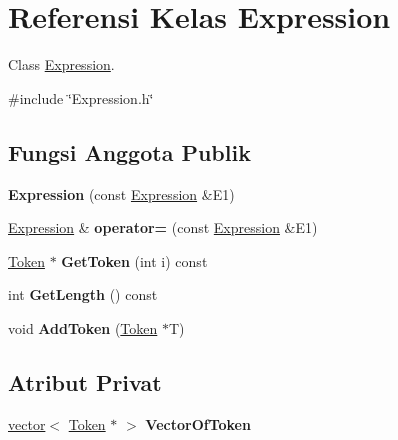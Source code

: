 \hypertarget{classExpression}{}\section{Referensi Kelas Expression}
\label{classExpression}


Class \hyperlink{classExpression}{Expression}.  




{\ttfamily \#include \char`\"{}Expression.\+h\char`\"{}}

\subsection*{Fungsi Anggota Publik}
\begin{DoxyCompactItemize}
\item 
\hypertarget{classExpression_adc6727acfb0cd72c184b6471be928e4a}{}{\bfseries Expression} (const \hyperlink{classExpression}{Expression} \&E1)\label{classExpression_adc6727acfb0cd72c184b6471be928e4a}

\item 
\hypertarget{classExpression_a50017a043b96ee516ed2cafad28bb509}{}\hyperlink{classExpression}{Expression} \& {\bfseries operator=} (const \hyperlink{classExpression}{Expression} \&E1)\label{classExpression_a50017a043b96ee516ed2cafad28bb509}

\item 
\hypertarget{classExpression_a8aff19bc0d16007c40ade71664771e4d}{}\hyperlink{classToken}{Token} $\ast$ {\bfseries Get\+Token} (int i) const \label{classExpression_a8aff19bc0d16007c40ade71664771e4d}

\item 
\hypertarget{classExpression_a0fc88810ca770214d6d221ad711133dd}{}int {\bfseries Get\+Length} () const \label{classExpression_a0fc88810ca770214d6d221ad711133dd}

\item 
\hypertarget{classExpression_a5e3c9fe32872a5c4a13b1188b024d151}{}void {\bfseries Add\+Token} (\hyperlink{classToken}{Token} $\ast$T)\label{classExpression_a5e3c9fe32872a5c4a13b1188b024d151}

\end{DoxyCompactItemize}
\subsection*{Atribut Privat}
\begin{DoxyCompactItemize}
\item 
\hypertarget{classExpression_a62d41b0699d28167d1d28357c5c866bc}{}\hyperlink{classvector}{vector}$<$ \hyperlink{classToken}{Token} $\ast$ $>$ {\bfseries Vector\+Of\+Token}\label{classExpression_a62d41b0699d28167d1d28357c5c866bc}

\end{DoxyCompactItemize}



